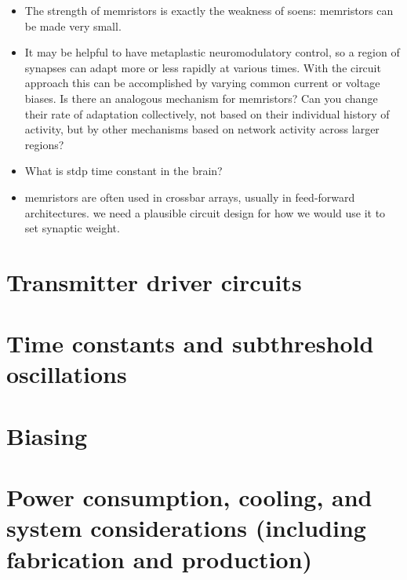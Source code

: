 \documentclass[twocolumn]{article}
\begin{document}
\begin{itemize}
\item The strength of memristors is exactly the weakness of soens: memristors can be made very small.

\item It may be helpful to have metaplastic neuromodulatory control, so a region of synapses can adapt more or less rapidly at various times. With the circuit approach this can be accomplished by varying common current or voltage biases. Is there an analogous mechanism for memristors? Can you change their rate of adaptation collectively, not based on their individual history of activity, but by other mechanisms based on network activity across larger regions?

\item What is stdp time constant in the brain?

\item memristors are often used in crossbar arrays, usually in feed-forward architectures. we need a plausible circuit design for how we would use it to set synaptic weight.

\end{itemize}

\section{\label{sec:transmitters}Transmitter driver circuits}

\section{\label{sec:time_constants}Time constants and subthreshold oscillations}

\section{\label{sec:biasing}Biasing}

\section{\label{sec:systems}Power consumption, cooling, and system considerations (including fabrication and production)}

\end{document}
